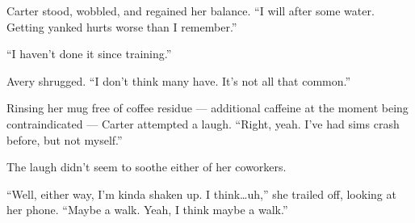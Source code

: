 Carter stood, wobbled, and regained her balance. ``I will after some water. Getting yanked hurts worse than I remember.''

``I haven't done it since training.''

Avery shrugged. ``I don't think many have. It's not all that common.''

Rinsing her mug free of coffee residue — additional caffeine at the moment being contraindicated — Carter attempted a laugh. ``Right, yeah. I've had sims crash before, but not myself.''

The laugh didn't seem to soothe either of her coworkers.

``Well, either way, I'm kinda shaken up. I think\ldots{}uh,'' she trailed off, looking at her phone. ``Maybe a walk. Yeah, I think maybe a walk.''
